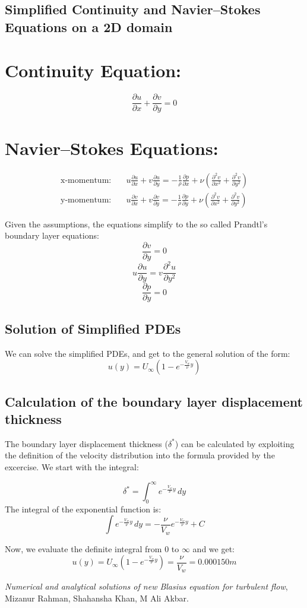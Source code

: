 \documentclass{article}
\begin{document}
\subsection{Simplified Continuity and Navier–Stokes Equations on a 2D domain}

\section*{Continuity Equation:}
\[
\frac{\partial u}{\partial x} + \frac{\partial v}{\partial y} = 0
\]

\section*{Navier–Stokes Equations:}
\begin{align*}
    \text{x-momentum:} & \quad u \frac{\partial u}{\partial x} + v \frac{\partial u}{\partial y} = -\frac{1}{\rho} \frac{\partial p}{\partial x} + \nu (\frac{\partial^2 v}{\partial x^2}+\frac{\partial^2 v}{\partial y^2}) \\
    \text{y-momentum:} & \quad u \frac{\partial v}{\partial x} + v \frac{\partial v}{\partial y} = -\frac{1}{\rho} \frac{\partial p}{\partial y} + \nu (\frac{\partial^2 v}{\partial x^2}+\frac{\partial^2 v}{\partial y^2})
\end{align*}

Given the assumptions, the equations simplify to the so called Prandtl's boundary layer equations:
\[
\frac{\partial v}{\partial y} = 0
\]
\[
u \frac{\partial u}{\partial y} = v \frac{\partial^2 u}{\partial y^2}
\]
\[
\frac{\partial p}{\partial y} = 0
\]

\subsection{Solution of Simplified PDEs}
We can solve the simplified PDEs, and get to the general solution of the form:
\[
u(y) = U_\infty \left(1 - e^{-\frac{V_w}{\nu} y}\right)
\]

\subsection{Calculation of the boundary layer displacement thickness}
The boundary layer displacement thickness (\(\delta^*\)) can be calculated by exploiting the definition of the velocity distribution into the formula provided by the excercise.
We start with the integral:

\[
\delta^* = \int_0^\infty e^{-\frac{V_w}{\nu} y} \, dy
\]
The integral of the exponential function is:
\[
\int e^{-\frac{V_w}{\nu} y} \, dy = -\frac{\nu}{V_w} e^{-\frac{V_w}{\nu} y} + C
\]

Now, we evaluate the definite integral from \(0\) to \(\infty\) and we get:
\[
u(y) = U_\infty \left(1 - e^{-\frac{V_w}{\nu} y}\right) = \frac{\nu}{V_w} = 0.000150 m
\]

\begin{thebibliography}{9}

  \textit{Numerical and analytical solutions of new Blasius equation for turbulent flow},
  Mizanur Rahman, Shahansha Khan, M Ali Akbar.
\end{thebibliography}
\end{document}

